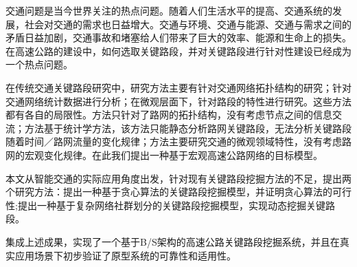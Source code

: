 
\begin{cabstract}

		交通问题是当今世界关注的热点问题。随着人们生活水平的提高、交通系统的发展，社会对交通的需求也日益增大。交通与环境、交通与能源、交通与需求之间的矛盾日益加剧，交通事故和堵塞给人们带来了巨大的效率、能源和生命上的损失。在高速公路的建设中，如何选取关键路段，并对关键路段进行针对性建设已经成为一个热点问题。

		在传统交通关键路段研究中，研究方法主要有针对交通网络拓扑结构的研究；针对交通网络统计数据进行分析；在微观层面下，针对路段的特性进行研究。这些方法都有各自的局限性。方法只针对了路网的拓扑结构，没有考虑节点之间的信息交流；方法基于统计学方法，该方法只能静态分析路网关键路段，无法分析关键路段随着时间／路网流量的变化规律；方法主要研究交通的微观领域特性，没有考虑路网的宏观变化规律。在此我们提出一种基于宏观高速公路网络的目标模型。

		本文从智能交通的实际应用角度出发，针对现有关键路段挖掘方法的不足，提出两个研究方法：提出一种基于贪心算法的关键路段挖掘模型，并证明贪心算法的可行性;提出一种基于复杂网络社群划分的关键路段挖掘模型，实现动态挖掘关键路段。

		集成上述成果，实现了一个基于B/S架构的高速公路关键路段挖掘系统，并且在真实应用场景下初步验证了原型系统的可靠性和适用性。
\end{cabstract}

